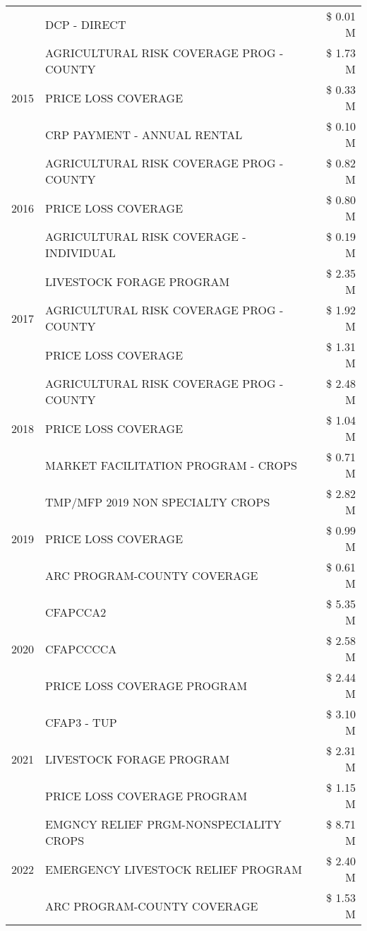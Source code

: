 \begin{tabular}{llr}
 & DCP - DIRECT & \$ 0.01 M \\
\cline{1-3}
\multirow[t]{3}{*}{2015} & AGRICULTURAL RISK COVERAGE PROG - COUNTY & \$ 1.73 M \\
 & PRICE LOSS COVERAGE & \$ 0.33 M \\
 & CRP PAYMENT - ANNUAL RENTAL & \$ 0.10 M \\
\cline{1-3}
\multirow[t]{3}{*}{2016} & AGRICULTURAL RISK COVERAGE PROG - COUNTY & \$ 0.82 M \\
 & PRICE LOSS COVERAGE & \$ 0.80 M \\
 & AGRICULTURAL RISK COVERAGE - INDIVIDUAL & \$ 0.19 M \\
\cline{1-3}
\multirow[t]{3}{*}{2017} & LIVESTOCK FORAGE PROGRAM & \$ 2.35 M \\
 & AGRICULTURAL RISK COVERAGE PROG - COUNTY & \$ 1.92 M \\
 & PRICE LOSS COVERAGE & \$ 1.31 M \\
\cline{1-3}
\multirow[t]{3}{*}{2018} & AGRICULTURAL RISK COVERAGE PROG - COUNTY & \$ 2.48 M \\
 & PRICE LOSS COVERAGE & \$ 1.04 M \\
 & MARKET FACILITATION PROGRAM - CROPS & \$ 0.71 M \\
\cline{1-3}
\multirow[t]{3}{*}{2019} & TMP/MFP 2019 NON SPECIALTY CROPS & \$ 2.82 M \\
 & PRICE LOSS COVERAGE & \$ 0.99 M \\
 & ARC PROGRAM-COUNTY COVERAGE & \$ 0.61 M \\
\cline{1-3}
\multirow[t]{3}{*}{2020} & CFAPCCA2 & \$ 5.35 M \\
 & CFAPCCCCA & \$ 2.58 M \\
 & PRICE LOSS COVERAGE PROGRAM & \$ 2.44 M \\
\cline{1-3}
\multirow[t]{3}{*}{2021} & CFAP3 - TUP & \$ 3.10 M \\
 & LIVESTOCK FORAGE PROGRAM & \$ 2.31 M \\
 & PRICE LOSS COVERAGE PROGRAM & \$ 1.15 M \\
\cline{1-3}
\multirow[t]{3}{*}{2022} & EMGNCY RELIEF PRGM-NONSPECIALITY CROPS & \$ 8.71 M \\
 & EMERGENCY LIVESTOCK RELIEF PROGRAM & \$ 2.40 M \\
 & ARC PROGRAM-COUNTY COVERAGE & \$ 1.53 M \\
\cline{1-3}
\bottomrule
\end{tabular}
